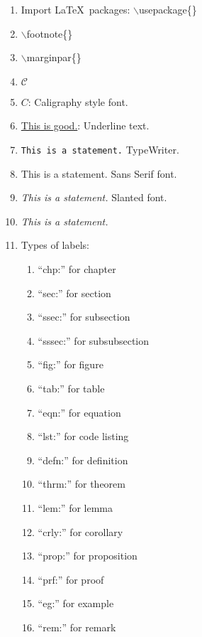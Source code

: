 \begin{enumerate}
\item Import \LaTeX\ packages: $\backslash$usepackage\{\}
\item $\backslash$footnote\{\}
\item $\backslash$marginpar\{\}
\item $\mathcal{C}$
\item $\mathit{C}$: Caligraphy style font.
\item \underline{This is good.}: Underline text.
\item \texttt{This is a statement.} TypeWriter.
\item \textsf{This is a statement.} Sans Serif font.
\item \textsl{This is a statement.} Slanted font.
\item \emph{This is a statement.}
\item Types of labels: \vspace{-0.3cm}
	\begin{enumerate} \itemsep -2pt
	\item ``chp:'' for chapter
	\item ``sec:'' for section
	\item ``ssec:'' for subsection
	\item ``sssec:'' for subsubsection
	\item ``fig:'' for figure
	\item ``tab:'' for table
	\item ``eqn:'' for equation
	\item ``lst:'' for code listing
	\item ``defn:'' for definition
	\item ``thrm:'' for theorem
	\item ``lem:'' for lemma
	\item ``crly:'' for corollary
	\item ``prop:'' for proposition
	\item ``prf:'' for proof
	\item ``eg:'' for example
	\item ``rem:'' for remark
	\end{enumerate}
\end{enumerate}


